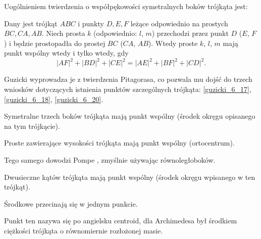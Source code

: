%

Uogólnieniem twierdzenia o współpękowości symetralnych boków trójkąta jest:

\begin{proposition}
\label{guzicki_6_13}%
	Dany jest trójkąt $ABC$ i punkty $D, E, F$ leżące odpowiednio na prostych $BC, CA, AB$.
	Niech prosta $k$ (odpowiednio: $l$, $m$) przechodzi przez punkt $D$ ($E$, $F$) i będzie prostopadła do prostej $BC$ ($CA$, $AB$).
	Wtedy proste $k$, $l$, $m$ mają punkt wspólny wtedy i tylko wtedy, gdy
	\begin{equation}
		|AF|^2 + |BD|^2 + |CE|^2 = |AE|^2 + |BF|^2 + |CD|^2.
	\end{equation}
\end{proposition}

Guzicki \cite[s. 176]{guzicki_2021} wyprowadza je z twierdzenia Pitagorasa, co pozwala mu dojść do trzech wniosków dotyczących istnienia punktów szczególnych trójkąta: \ref{guzicki_6_17}, \ref{guzicki_6_18}, \ref{guzicki_6_20}.

\begin{corollary}
\label{guzicki_6_17}%
    Symetralne trzech boków trójkąta mają punkt wspólny (środek okręgu opisanego na tym trójkącie).
\end{corollary}

\begin{corollary}
\label{guzicki_6_18}%
    Proste zawierające wysokości trójkąta mają punkt wspólny (ortocentrum).
%
\end{corollary}

Tego samego dowodzi Pompe \cite[s. 38]{pompe_2022}, zmyślnie używając równoległoboków.

\begin{corollary} %
\label{guzicki_6_20}%
    Dwusieczne kątów trójkąta mają punkt wspólny (środek okręgu wpisanego w ten trójkąt).
\end{corollary}

Środkowe przecinają się w jednym punkcie. %

Punkt ten nazywa się po angielsku centroid, dla Archimedesa był środkiem ciężkości trójkąta o równomiernie rozłożonej masie.

%